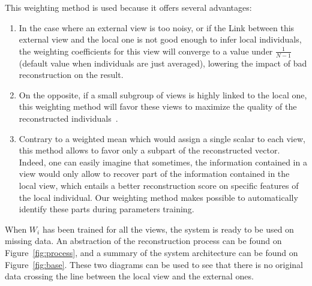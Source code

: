This weighting method is used because it offers several advantages:
		\begin{enumerate}
            \item In the case where an external view is too noisy, or if the Link between this external view and the local one is not good enough to infer local individuals, the weighting coefficients for this view will converge to a value under $\frac{1}{N-1}$ (default value when individuals are just averaged), lowering the impact of bad reconstruction on the result.
    \item On the opposite, if a small subgroup of views is highly linked to the local one, this weighting method will favor these views to maximize the quality of the reconstructed individuals~\cite{sublime2017analysis,sublime2018analysis}.
    \item Contrary to a weighted mean which would assign a single scalar to each view, this method allows to favor only a subpart of the reconstructed vector. Indeed, one can easily imagine that sometimes, the information contained in a view would only allow to recover part of the information contained in the local view, which entails a better reconstruction score on specific features of the local individual. Our weighting method makes possible to automatically identify these parts during parameters training.
		\end{enumerate}
		
When $W_i$ has been trained for all the views, the system is ready to be used on missing data. An abstraction of the reconstruction process can be found on Figure~\ref{fig:process}, and a summary of the system architecture can be found on Figure~\ref{fig:base}. These two diagrams can be used to see that there is no original data crossing the line between the local view and the external ones.
	
